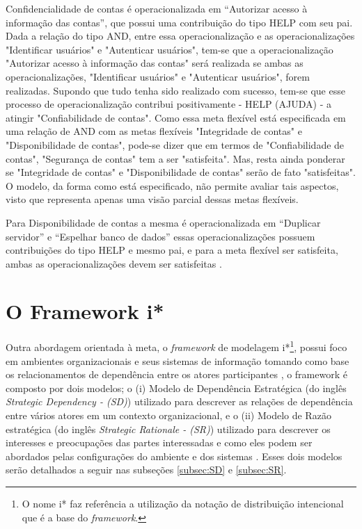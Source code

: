 Confidencialidade de contas é operacionalizada em “Autorizar acesso à informação das contas”, que possui uma contribuição do tipo HELP com seu pai. Dada a relação do tipo AND, entre essa operacionalização e as operacionalizações "Identificar usuários" e "Autenticar usuários", tem-se que a operacionalização "Autorizar acesso à informação das contas"  será realizada se ambas as operacionalizações, "Identificar usuários" e "Autenticar usuários", forem realizadas. Supondo que tudo tenha sido realizado com sucesso, tem-se que esse processo de operacionalização contribui positivamente - HELP (AJUDA) - a atingir "Confiabilidade de contas". Como essa meta flexível está especificada em uma relação de AND com as metas flexíveis "Integridade de contas" e "Disponibilidade de contas", pode-se dizer que em termos de "Confiabilidade de contas", "Segurança de contas" tem a ser "satisfeita". Mas, resta ainda ponderar se "Integridade de contas" e "Disponibilidade de contas" serão de fato "satisfeitas". O modelo, da forma como está especificado, não permite avaliar tais aspectos, visto que representa apenas uma visão parcial dessas metas flexíveis.


Para Disponibilidade de contas a mesma é operacionalizada em “Duplicar servidor” e “Espelhar banco de dados” essas operacionalizações possuem contribuições do tipo HELP e mesmo pai, e para a meta flexível ser satisfeita, ambas as operacionalizações devem ser satisfeitas \cite{affleck2012supporting}. 


\section{O Framework i*}
\label{sec:i*}


Outra abordagem orientada à meta, o \textit{framework} de modelagem i*\footnote[1]{O nome i* faz referência a utilização da notação de distribuição intencional que é a base do \textit{framework}.}, possui foco em ambientes organizacionais e seus sistemas de informação tomando como base os relacionamentos de dependência entre os atores participantes \cite{yu1997towards} \cite{istarwiki20}, o framework é composto por dois modelos; o (i) Modelo de Dependência Estratégica (do inglês \textit{Strategic Dependency - (SD)}) utilizado para descrever as relações de dependência entre vários atores em um contexto organizacional, e o (ii) Modelo de Razão estratégica (do inglês \textit{Strategic Rationale - (SR)}) utilizado para descrever os interesses e preocupações das partes interessadas e como eles podem ser abordados pelas configurações do ambiente e dos sistemas \cite{yu1997towards}. Esses dois modelos serão detalhados a seguir nas subseções \ref{subsec:SD} e \ref{subsec:SR}.

